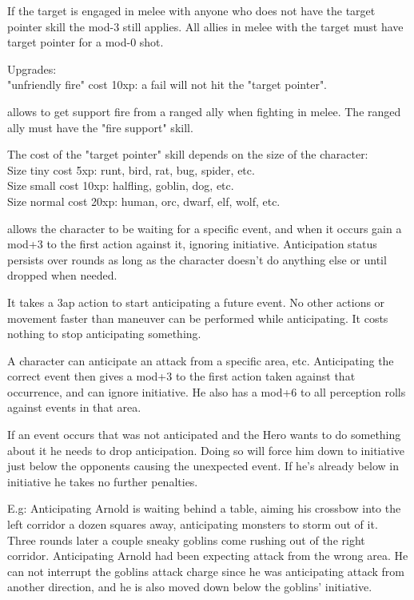 If the target is engaged in melee with anyone who does not have the target pointer skill the mod-3 still applies. All allies in melee with the target must have target pointer for a mod-0 shot.

Upgrades: \\
"unfriendly fire" cost 10xp: a fail will not hit the "target pointer".


 allows to get support fire from a ranged ally when fighting in melee. The ranged ally must have the "fire support" skill.

The cost of the "target pointer" skill depends on the size of the character: \\
Size tiny cost 5xp: runt, bird, rat, bug, spider, etc. \\
Size small cost 10xp: halfling, goblin, dog, etc. \\
Size normal cost 20xp: human, orc, dwarf, elf, wolf, etc.


 allows the character to be waiting for a specific event, and when it occurs gain a mod+3 to the first action against it, ignoring initiative. Anticipation status persists over rounds as long as the character doesn't do anything else or until dropped when needed.

It takes a 3ap action to start anticipating a future event. No other actions or movement faster than maneuver can be performed while anticipating. It costs nothing to stop anticipating something.

A character can anticipate an attack from a specific area, etc. Anticipating the correct event then gives a mod+3 to the first action taken against that occurrence, and can ignore initiative. He also has a mod+6 to all perception rolls against events in that area.

If an event occurs that was not anticipated and the Hero wants to do something about it he needs to drop anticipation. Doing so will force him down to initiative just below the opponents causing the unexpected event. If he's already below in initiative he takes no further penalties.

E.g: Anticipating Arnold is waiting behind a table, aiming his crossbow into the left corridor a dozen squares away, anticipating monsters to storm out of it. Three rounds later a couple sneaky goblins come rushing out of the right corridor. Anticipating Arnold had been expecting attack from the wrong area. He can not interrupt the goblins attack charge since he was anticipating attack from another direction, and he is also moved down below the goblins' initiative.

